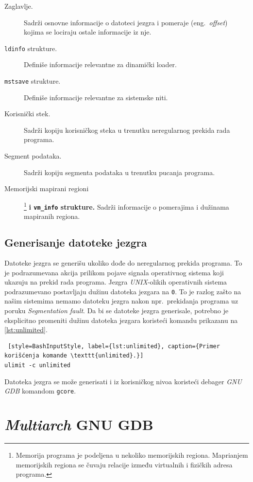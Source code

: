 \documentclass[12pt,oneside]{memoir}
\begin{document}
\begin{description}
	\item[Zaglavlje.]
	Sadrži osnovne informacije o datoteci jezgra i pomeraje (eng.\emph{~offset}) kojima se lociraju ostale informacije iz nje.
	\item[\texttt{ldinfo} strukture.]   
	Definiše informacije relevantne za dinamički loader.
	\item[\texttt{mstsave} strukture.]
	Definiše informacije relevantne za sistemske niti.
	\item[Korisnički stek.]
	Sadrži kopiju korisničkog steka u trenutku neregularnog prekida rada programa.
	\item[Segment podataka.]   
	Sadrži kopiju segmenta podataka u trenutku pucanja programa.
	\item[Memorijski mapirani regioni]\footnote{Memorija programa je podeljena u nekoliko memorijskih regiona. Maprianjem memorijskih regiona se čuvaju relacije između virtualnih i fizičkih adresa programa.} \textbf{i \texttt{vm\_info} strukture.}
	Sadrži informacije o pomerajima i dužinama mapiranih regiona.
\end{description}

\subsection{Generisanje datoteke jezgra}

Datoteke jezgra se generišu ukoliko dođe do neregularnog prekida programa. To je podrazumevana akcija prilikom pojave signala operativnog sistema koji ukazuju na prekid rada programa. Jezgra \emph{UNIX}-olikih operativnih sistema podrazumevano postavljaju dužinu datoteka jezgara na \texttt{0}. To je razlog zašto na našim sistemima nemamo datoteku jezgra nakon npr.~prekidanja programa uz poruku \emph{Segmentation fault}. Da bi se datoteke jezgra generisale, potrebno je eksplicitno promeniti dužinu datoteka jezgara koristeći komandu prikazanu na \ref{lst:unlimited}.

\begin{lstlisting} [style=BashInputStyle, label={lst:unlimited}, caption={Primer korišćenja komande \texttt{unlimited}.}]
ulimit -c unlimited

\end{lstlisting}

Datoteka jezgra se može generisati i iz korisničkog nivoa koristeći debager \emph{GNU GDB} komandom \texttt{gcore}.

\section{\emph{Multiarch} GNU GDB}
\end{document}
